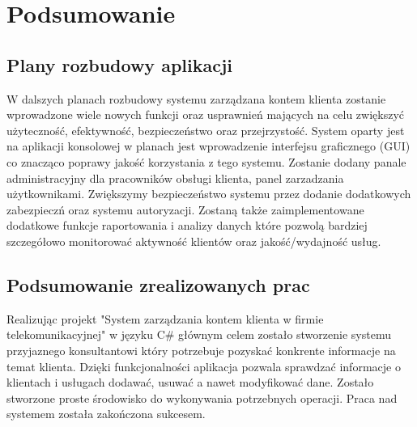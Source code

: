 \chapter{Podsumowanie}

\section{Plany rozbudowy aplikacji}

W dalszych planach rozbudowy systemu zarządzana kontem klienta zostanie wprowadzone wiele nowych funkcji oraz usprawnień mających na celu zwiększyć użyteczność, efektywność, bezpieczeństwo oraz przejrzystość.
System oparty jest na aplikacji konsolowej w planach jest wprowadzenie interfejsu graficznego (GUI) co znacząco poprawy jakość korzystania z tego systemu. Zostanie dodany panale administracyjny dla pracowników obsługi klienta, panel zarzadzania użytkownikami. Zwiększymy bezpieczeństwo systemu przez dodanie dodatkowych zabezpieczń oraz systemu autoryzacji. Zostaną także zaimplementowane dodatkowe funkcje raportowania i analizy danych które pozwolą bardziej szczegółowo monitorować aktywność klientów oraz jakość/wydajność usług. 

\section{Podsumowanie zrealizowanych prac}

Realizując projekt "System zarządzania kontem klienta w firmie telekomunikacyjnej" w języku C\# głównym celem zostało stworzenie systemu przyjaznego konsultantowi który potrzebuje pozyskać konkrente informacje na temat klienta. Dzięki funkcjonalności aplikacja pozwala sprawdzać informacje o klientach i usługach dodawać, usuwać a nawet modyfikować dane. Zostało stworzone proste środowisko do wykonywania potrzebnych operacji. Praca nad systemem została zakończona sukcesem. 